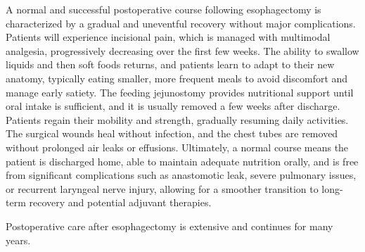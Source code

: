 A normal and successful postoperative course following esophagectomy is characterized by a gradual and uneventful recovery without major complications. Patients will experience incisional pain, which is managed with multimodal analgesia, progressively decreasing over the first few weeks. The ability to swallow liquids and then soft foods returns, and patients learn to adapt to their new anatomy, typically eating smaller, more frequent meals to avoid discomfort and manage early satiety. The feeding jejunostomy provides nutritional support until oral intake is sufficient, and it is usually removed a few weeks after discharge. Patients regain their mobility and strength, gradually resuming daily activities. The surgical wounds heal without infection, and the chest tubes are removed without prolonged air leaks or effusions. Ultimately, a normal course means the patient is discharged home, able to maintain adequate nutrition orally, and is free from significant complications such as anastomotic leak, severe pulmonary issues, or recurrent laryngeal nerve injury, allowing for a smoother transition to long-term recovery and potential adjuvant therapies.

Postoperative care after esophagectomy is extensive and continues for many years.

